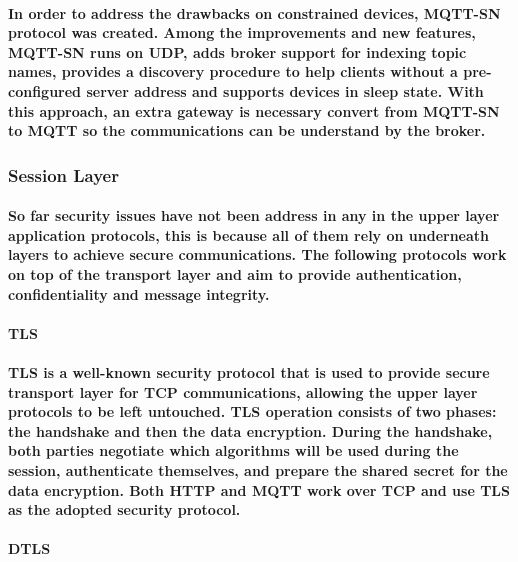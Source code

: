 \paragraph{
	In order to address the drawbacks on constrained devices, \ac{MQTT-SN} protocol\cite{Ibm2013} was created. Among the improvements and new features, \ac{MQTT-SN} runs on UDP, adds broker support for indexing topic names, provides a discovery procedure to help clients without a pre-configured server address and supports devices in sleep state. With this approach, an extra gateway is necessary convert from \ac{MQTT-SN} to \ac{MQTT} so the communications can be understand by the broker.
}


\subsubsection{Session Layer}

\paragraph{	
	So far security issues have not been address in any in the upper layer application protocols, this is because all of them rely on underneath layers to achieve secure communications. The following protocols work on top of the transport layer and aim to provide authentication, confidentiality and message integrity.
}

\paragraph{\textbf{\ac{TLS}}}
\paragraph{
	\ac{TLS} is a well-known security protocol that is used to provide secure transport layer for \ac{TCP} communications, allowing the upper layer protocols to be left untouched. \ac{TLS} operation consists of two phases: the handshake and then the data encryption. During the handshake, both parties negotiate which algorithms will be used during the session, authenticate themselves, and prepare the shared secret for the data encryption.
	Both \ac{HTTP} and \ac{MQTT} work over \ac{TCP} and use \ac{TLS} as the adopted security protocol.
}

\paragraph{\textbf{\ac{DTLS}}}

